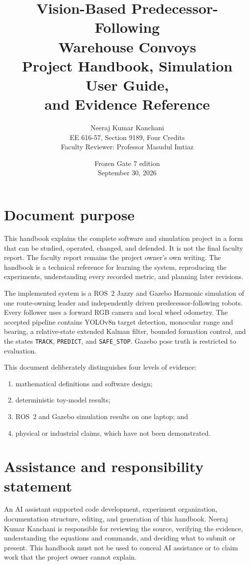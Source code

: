 \documentclass[11pt,oneside,openany]{book}
\title{\Huge Vision-Based Predecessor-Following\\Warehouse Convoys\\[0.4em]
\Large Project Handbook, Simulation User Guide,\\and Evidence Reference}
\author{\Large Neeraj Kumar Kanchani\\[0.7em]
EE 616-57, Section 9189, Four Credits\\
Faculty Reviewer: Professor Masudul Imtiaz}
\date{Frozen Gate 7 edition\\September 30, 2026}
\newcommand{\state}[1]{\texttt{#1}}
\begin{document}
\frontmatter
\hypersetup{pageanchor=false}
\maketitle
\clearpage
\hypersetup{pageanchor=true}

\chapter*{Document purpose}

This handbook explains the complete software and simulation project in a form that can be studied, operated, changed, and defended. It is not the final faculty report. The faculty report remains the project owner's own writing. The handbook is a technical reference for learning the system, reproducing the experiments, understanding every recorded metric, and planning later revisions.

The implemented system is a ROS~2 Jazzy and Gazebo Harmonic simulation of one route-owning leader and independently driven predecessor-following robots. Every follower uses a forward RGB camera and local wheel odometry. The accepted pipeline contains YOLOv8n target detection, monocular range and bearing, a relative-state extended Kalman filter, bounded formation control, and the states \state{TRACK}, \state{PREDICT}, and \state{SAFE\_STOP}. Gazebo pose truth is restricted to evaluation.

This document deliberately distinguishes four levels of evidence:
\begin{enumerate}
  \item mathematical definitions and software design;
  \item deterministic toy-model results;
  \item ROS~2 and Gazebo simulation results on one laptop; and
  \item physical or industrial claims, which have not been demonstrated.
\end{enumerate}

\chapter*{Assistance and responsibility statement}

An AI assistant supported code development, experiment organization, documentation structure, editing, and generation of this handbook. Neeraj Kumar Kanchani is responsible for reviewing the source, verifying the evidence, understanding the equations and commands, and deciding what to submit or present. This handbook must not be used to conceal AI assistance or to claim work that the project owner cannot explain.
\end{document}
